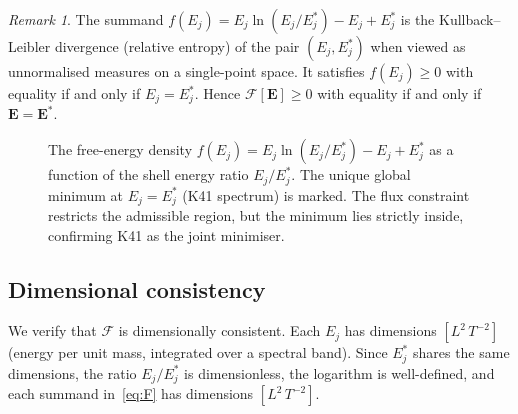 \documentclass[12pt,a4paper]{article}
\theoremstyle{definition}
\theoremstyle{plain}
\theoremstyle{remark}
\newtheorem{remark}[definition]{Remark}
\begin{document}
\begin{remark}
The summand $f(E_j) = E_j \ln(E_j/E_j^*) - E_j + E_j^*$ is the
Kullback--Leibler divergence (relative entropy) of the pair $(E_j, E_j^*)$
when viewed as unnormalised measures on a single-point space.  It satisfies
$f(E_j) \ge 0$ with equality if and only if $E_j = E_j^*$.  Hence
$\mathcal{F}[\mathbf{E}] \ge 0$ with equality if and only if $\mathbf{E}
= \mathbf{E}^*$.
\end{remark}

\begin{figure}[ht]
\centering
{}
\caption{The free-energy density $f(E_j) = E_j \ln(E_j / E_j^*) - E_j + E_j^*$
as a function of the shell energy ratio $E_j / E_j^*$. The unique global minimum
at $E_j = E_j^*$ (K41 spectrum) is marked. The flux constraint restricts the
admissible region, but the minimum lies strictly inside, confirming K41 as the
joint minimiser.}
\label{fig:FE-landscape}
\end{figure}

\subsection{Dimensional consistency}

We verify that $\mathcal{F}$ is dimensionally consistent.  Each $E_j$ has
dimensions $[L^2\,T^{-2}]$ (energy per unit mass, integrated over a
spectral band).  Since $E_j^*$ shares the same dimensions, the ratio
$E_j/E_j^*$ is dimensionless, the logarithm is well-defined, and each
summand in~\eqref{eq:F} has dimensions $[L^2\,T^{-2}]$.
\end{document}
